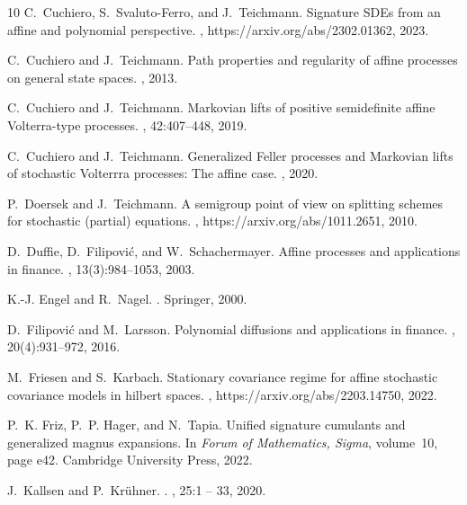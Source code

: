 \documentclass[a4paper,12pt]{article}
\theoremstyle{definition}
\theoremstyle{remark}
\numberwithin{equation}{section}
\numberwithin{theorem}{section}
\begin{document}
\begin{thebibliography}{10}
C.~Cuchiero, S.~Svaluto-Ferro, and J.~Teichmann.
\newblock Signature {SDEs} from an affine and polynomial perspective.
, https://arxiv.org/abs/2302.01362, 2023.

C.~Cuchiero and J.~Teichmann.
\newblock Path properties and regularity of affine processes on general state
  spaces.
, 2013.

C.~Cuchiero and J.~Teichmann.
\newblock Markovian lifts of positive semidefinite affine {V}olterra-type
  processes.
, 42:407--448, 2019.

C.~Cuchiero and J.~Teichmann.
\newblock Generalized {F}eller processes and {M}arkovian lifts of stochastic
  {V}olterrra processes: The affine case.
, 2020.

P.~Doersek and J.~Teichmann.
\newblock A semigroup point of view on splitting schemes for stochastic
  (partial) equations.
, https://arxiv.org/abs/1011.2651, 2010.

D.~Duffie, D.~Filipovi{\'c}, and W.~Schachermayer.
\newblock Affine processes and applications in finance.
, 13(3):984--1053, 2003.

K.-J. Engel and R.~Nagel.
.
\newblock Springer, 2000.

D.~Filipovi{\'c} and M.~Larsson.
\newblock Polynomial diffusions and applications in finance.
, 20(4):931--972, 2016.

M.~Friesen and S.~Karbach.
\newblock Stationary covariance regime for affine stochastic covariance models
  in hilbert spaces.
, https://arxiv.org/abs/2203.14750, 2022.

P.~K. Friz, P.~P. Hager, and N.~Tapia.
\newblock Unified signature cumulants and generalized magnus expansions.
\newblock In {\em Forum of Mathematics, Sigma}, volume~10, page e42. Cambridge
  University Press, 2022.

J.~Kallsen and P.~Kr{\"u}hner.
.
, 25:1 -- 33, 2020.


\end{thebibliography}
\end{document}
